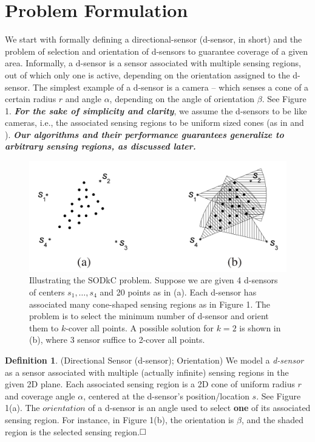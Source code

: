 \documentclass[conference]{IEEEtran}
\theoremstyle{definition}
\newtheorem{definition}{Definition}
\newtheorem*{NP-Hardness of Approximating the SODkC Problem}{NP-Hardness of Approximating the SODkC Problem}
\newtheorem*{Greedy Algorithm (GA)}{Greedy Algorithm (GA)}
\newtheorem*{GA on the Running Example}{GA on the Running Example}
\newtheorem*{Performance Guarantee of GA}{Performance Guarantee of GA}
\begin{document}
\section{Problem Formulation}
We start with formally defining a directional-sensor (d-sensor, in short) and the problem of selection and orientation of d-sensors to guarantee coverage of a given area. Informally, a d-sensor is a sensor associated with multiple sensing regions, out of which only one is active, depending on the orientation assigned to the d-sensor. The simplest example of a d-sensor is a camera – which senses a cone of a certain radius $r$ and angle $\alpha$, depending on the angle of orientation $\beta$. See Figure 1. \textbf{\emph{For the sake of simplicity and clarity}}, we assume the d-sensors to be like cameras, i.e., the associated sensing regions to be uniform sized cones (as in \cite{10.1007/11599463_70} and \cite{4068136}). \textbf{\emph{Our algorithms and their performance guarantees generalize to arbitrary sensing regions, as discussed later.}}

\begin{figure}
    \centering
    \includegraphics[width=0.8\columnwidth]{2.png}
    \caption{Illustrating the SODkC problem. Suppose we are given 4 d-sensors of centers $s_1,\dots,s_4$ and 20 points as in (a). Each d-sensor has associated many cone-shaped sensing regions as in Figure 1. The problem is to select the minimum number of d-sensor and orient them to $k$-cover all points. A possible solution for $k = 2$ is shown in (b), where 3 sensor suffice to 2-cover all points.
}
    \label{fig:enter-label}
\end{figure}

\begin{definition}
(Directional Sensor (d-sensor); Orientation) We model a \textit{d-sensor} as a sensor associated with multiple (actually infinite) sensing regions in the given 2D plane. Each associated sensing region is a 2D cone of uniform radius $r$ and coverage angle $\alpha$, centered at the d-sensor’s position/location $s$. See Figure 1(a). The $orientation$ of a d-sensor is an angle used to select \textbf{one} of its associated sensing region. For instance, in Figure 1(b), the orientation is $\beta$, and the shaded region is the selected sensing region.$\hfill\square$
\end{definition}
\end{document}
